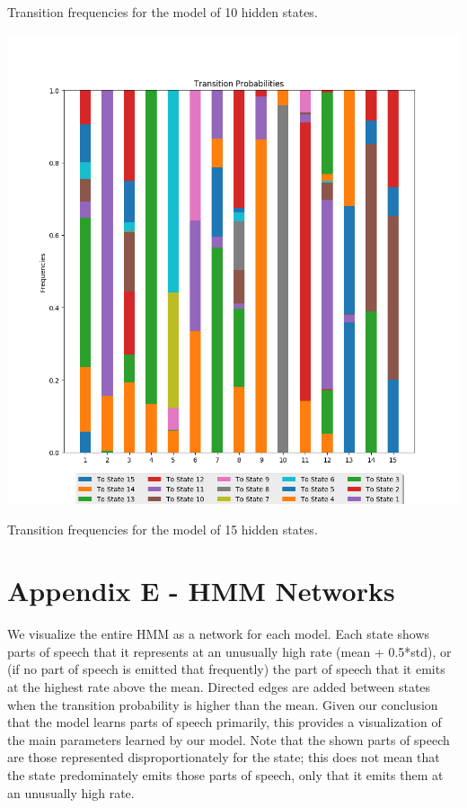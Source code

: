 Transition frequencies for the model of 10 hidden states.

\begin{center}
\includegraphics[scale=0.6]{../src/results/transitions_15}
\end{center}

Transition frequencies for the model of 15 hidden states.

\pagebreak
\section{Appendix E - HMM Networks}
We visualize the entire HMM as a network for each model. Each state shows parts of speech that it represents at an unusually high rate (mean + 0.5*std), or (if no part of speech is emitted that frequently) the part of speech that it emits at the highest rate above the mean. Directed edges are added between states when the transition probability is higher than the mean. Given our conclusion that the model learns parts of speech primarily, this provides a visualization of the main parameters learned by our model. Note that the shown parts of speech are those represented disproportionately for the state; this does not mean that the state predominately emits those parts of speech, only that it emits them at an unusually high rate.

